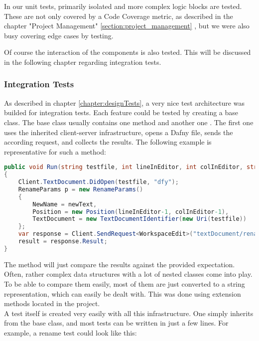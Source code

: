In our unit tests, primarily isolated and more complex logic blocks are tested.
These are not only covered by a Code Coverage metric, as described in the chapter "Project Management"
\ref{section:project_management} ,
but we were also busy covering edge cases by testing.

Of course the interaction of the components is also tested.
This will be discussed in the following chapter regarding integration tests.

\subsubsection{Integration Tests}
As described in chapter \ref{chapter:designTests}, a very nice test architecture was builded for integration tests.
Each feature could be tested by creating a base class.
The base class usually contains one method  and another one .
The first one uses the inherited client-server infrastructure, opens a Dafny file, sends the according request, and collects the results.
The following example is representative for such a method:

\begin{lstlisting}[language=csharp, caption={Finding a Declaration}, captionpos=b, label={lst:visitorfinddecl}]
public void Run(string testfile, int lineInEditor, int colInEditor, string newText = "newText")
{
    Client.TextDocument.DidOpen(testfile, "dfy");
    RenameParams p = new RenameParams()
    {
        NewName = newText,
        Position = new Position(lineInEditor-1, colInEditor-1),
        TextDocument = new TextDocumentIdentifier(new Uri(testfile))
    };
    var response = Client.SendRequest<WorkspaceEdit>("textDocument/rename", p, CancellationSource.Token);
    result = response.Result;
}
\end{lstlisting}

The  method will just compare the results against the provided expectation.
Often, rather complex data structures with a lot of nested classes come into play.
To be able to compare them easily, most of them are just converted to a string representation, which can easily be dealt with.
This was done using extension methods located in the  project.\\

A test itself is created very easily with all this infrastructure.
One simply inherits from the base class, and most tests can be written in just a few lines.
For example, a rename test could look like this:

